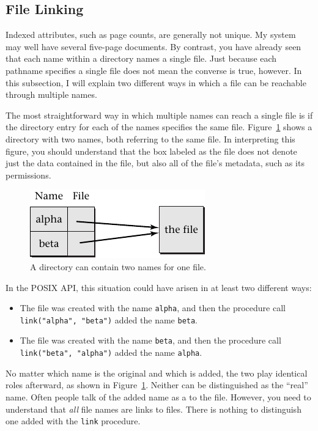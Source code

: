 \subsection{File Linking}\label{file-linking-section}

Indexed attributes, such as page counts, are generally not unique.  My
system may well have several five-page documents.  By contrast, you have
already seen that each name within a directory names a single file.
Just because each pathname specifies a single file does not mean the
converse is true, however.  In this subsection, I will explain two
different ways in which a file can be reachable through multiple
names.

The most straightforward way in which multiple names can reach a
single file is if the directory entry for each of the names specifies
the same file.  Figure~\ref{hardlink} shows a directory with two
names, both referring to the same file.  In interpreting this figure, you should
understand that the box labeled as the file does not denote just the
data contained in the file, but also all of the file's metadata,
such as its permissions.
\begin{figure}
\centerline{\includegraphics{hail_f0815}}
\caption{A directory can contain two names for one file.}\label{hardlink}
\end{figure}
In the POSIX API, this
situation could have arisen in at least two different ways:
\begin{itemize}
\item
The file was created with the name \verb|alpha|, and then the
procedure call \verb|link("alpha", "beta")| added the name \verb|beta|.
\item
The file was created with the name \verb|beta|, and then the
procedure call \verb|link("beta", "alpha")| added the name \verb|alpha|.
\end{itemize}
No matter which name is the original and which is added, the two play
identical roles afterward, as shown in Figure~\ref{hardlink}.  Neither can be
distinguished as the ``real'' name.  Often people talk of the added
name as a  to the file.  However, you need to understand that \emph{all} file
names are links to files.  There is nothing to distinguish one added
with the \verb|link| procedure.

